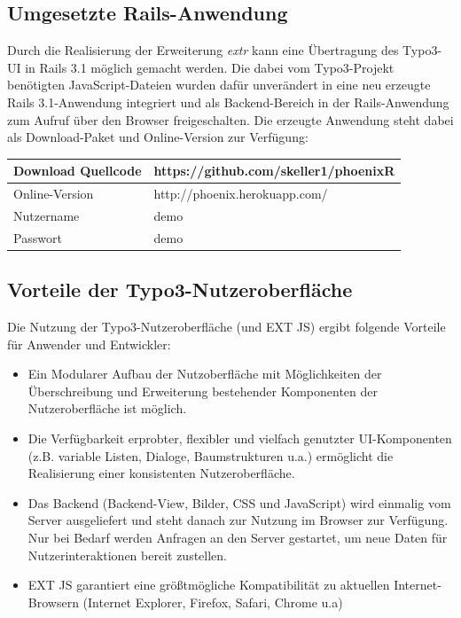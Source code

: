 \subsection{Umgesetzte Rails-Anwendung}
Durch die Realisierung der Erweiterung \emph{extr} kann eine Übertragung des Typo3-UI in Rails 3.1 möglich gemacht werden. Die dabei vom Typo3-Projekt benötigten JavaScript-Dateien wurden dafür unverändert in eine neu erzeugte Rails 3.1-Anwendung integriert und als Backend-Bereich in der Rails-Anwendung zum Aufruf über den Browser freigeschalten. Die erzeugte Anwendung steht dabei als Download-Paket und Online-Version zur Verfügung:
\begin{table}[!h]
\begin{tabular}{|l|p{10cm}|}
\hline
Download Quellcode & https://github.com/skeller1/phoenixR \\
\hline
Online-Version & http://phoenix.herokuapp.com/ \\
\hline
Nutzername & demo \\
\hline
Passwort & demo \\
\hline
\end{tabular}
\end{table}

\subsection{Vorteile der Typo3-Nutzeroberfläche}
Die Nutzung der Typo3-Nutzeroberfläche (und EXT JS) ergibt folgende Vorteile für Anwender und Entwickler:
\begin{itemize}
\item
Ein Modularer Aufbau der Nutzoberfläche mit Möglichkeiten der Überschreibung und Erweiterung bestehender Komponenten der Nutzeroberfläche ist möglich.
\item
Die Verfügbarkeit erprobter, flexibler und vielfach genutzter UI-Komponenten (z.B. variable Listen, Dialoge, Baumstrukturen u.a.) ermöglicht die Realisierung einer konsistenten Nutzeroberfläche.
\item
Das Backend (Backend-View, Bilder, CSS und JavaScript) wird einmalig vom Server ausgeliefert und steht danach zur Nutzung im Browser zur Verfügung. Nur bei Bedarf werden Anfragen an den Server gestartet, um neue Daten für Nutzerinteraktionen bereit zustellen.
\item
EXT JS garantiert eine größtmögliche Kompatibilität zu aktuellen Internet-Browsern (Internet Explorer, Firefox, Safari, Chrome u.a)
\end{itemize}

